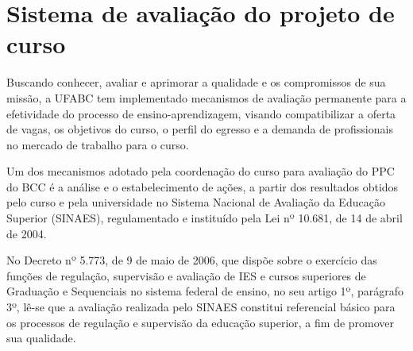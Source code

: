 \section{Sistema de avaliação do projeto de curso}
\label{sec:avaliacao_projeto}

Buscando conhecer, avaliar e aprimorar a qualidade e os compromissos de sua
missão, a UFABC tem implementado mecanismos de avaliação permanente para a
efetividade do processo de ensino-aprendizagem, visando compatibilizar a oferta
de vagas, os objetivos do curso, o perfil do egresso e a demanda de
profissionais no mercado de trabalho para o curso.

Um dos mecanismos adotado pela coordenação do curso para avaliação do PPC do
BCC é a análise e o estabelecimento de ações, a partir dos resultados obtidos
pelo curso e pela universidade no Sistema Nacional de Avaliação da Educação
Superior (SINAES), regulamentado e instituído pela Lei nº 10.681, de 14 de
abril de 2004.

No Decreto nº 5.773, de 9 de maio de 2006, que dispõe sobre o exercício das
funções de regulação, supervisão e avaliação de IES e cursos superiores de
Graduação e Sequenciais no sistema federal de ensino, no seu artigo 1º,
parágrafo 3º, lê-se que a avaliação realizada pelo SINAES constitui referencial
básico para os processos de regulação e supervisão da educação superior, a fim
de promover sua qualidade.


